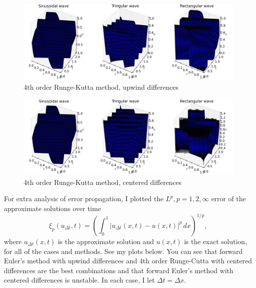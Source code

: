 \documentclass[10pt]{article}
\begin{document}
\begin{itemize}
\begin{figure}[H]
  \centering
  \caption{4th order Runge-Kutta method, upwind differences}
  \vspace{5 mm}
    \includegraphics[scale=0.5]{pde_solution_combo2}
\end{figure}

\begin{figure}[H]
  \centering
   \caption{4th order Runge-Kutta method, centered differences}
   \vspace{5 mm}
    \includegraphics[scale=0.5]{pde_solution_combo3}
\end{figure}

For extra analysis of error propagation, I plotted the $ L^p, p = 1,2, \infty $ error of the approximate solutions over time $$\xi_p(u_{\Delta t}, t) = \left( \int_{0}^{1}| u_{\Delta t}(x,t) - u(x,t) |^p \, dx \right)^{1/p}, $$ where $ u_{\Delta t}(x,t) $ is the approximate solution and $  u(x,t)  $ is the exact solution, for all of the cases and methods. See my plots below. You can see that forward Euler's method with upwind differences and 4th order Runge-Cutta with centered differences are the best combinations and that forward Euler's method with centered differences is unstable. In each case, I let $ \Delta t = \Delta x $.


\end{itemize}
\end{document}
